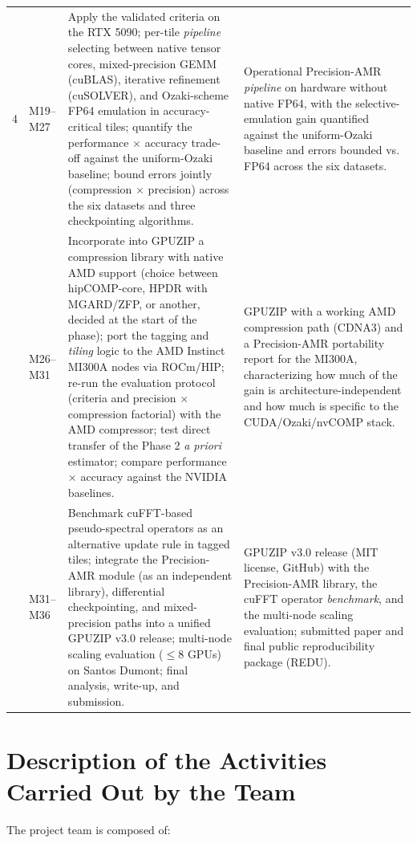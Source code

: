 \documentclass[12pt,a4paper]{article}
\begin{document}
\begin{longtable}{@{}p{}p{}p{}p{}@{}}
4 & M19--M27 & Apply the validated criteria on the RTX 5090; per-tile
\emph{pipeline} selecting between native tensor cores, mixed-precision GEMM
(cuBLAS), iterative refinement (cuSOLVER), and Ozaki-scheme FP64 emulation
in accuracy-critical tiles; quantify the performance $\times$ accuracy
trade-off against the uniform-Ozaki baseline; bound errors jointly
(compression $\times$ precision) across the six datasets and three
checkpointing algorithms. & Operational Precision-AMR \emph{pipeline} on
hardware without native FP64, with the selective-emulation gain quantified
against the uniform-Ozaki baseline and errors bounded vs. FP64 across the
six datasets.\\
\addlinespace
5 & M26--M31 & Incorporate into GPUZIP a compression library with native
AMD support (choice between hipCOMP-core, HPDR with MGARD/ZFP, or another,
decided at the start of the phase); port the tagging and \emph{tiling}
logic to the AMD Instinct MI300A nodes via ROCm/HIP; re-run the evaluation
protocol (criteria and precision $\times$ compression factorial) with the
AMD compressor; test direct transfer of the Phase 2 \emph{a priori}
estimator; compare performance $\times$ accuracy against the NVIDIA
baselines. & GPUZIP with a working AMD compression path (CDNA3) and a
Precision-AMR portability report for the MI300A, characterizing how much
of the gain is architecture-independent and how much is specific to the
CUDA/Ozaki/nvCOMP stack.\\
\addlinespace
6 & M31--M36 & Benchmark cuFFT-based pseudo-spectral operators as an
alternative update rule in tagged tiles; integrate the Precision-AMR
module (as an independent library), differential checkpointing, and
mixed-precision paths into a unified GPUZIP v3.0 release; multi-node
scaling evaluation ($\leq$8 GPUs) on Santos Dumont; final analysis,
write-up, and submission. & GPUZIP v3.0 release (MIT license, GitHub) with
the Precision-AMR library, the cuFFT operator \emph{benchmark}, and the
multi-node scaling evaluation; submitted paper and final public
reproducibility package (REDU).\\
\end{longtable}

\section{Description of the Activities Carried Out by the Team}

The project team is composed of:
\end{document}
